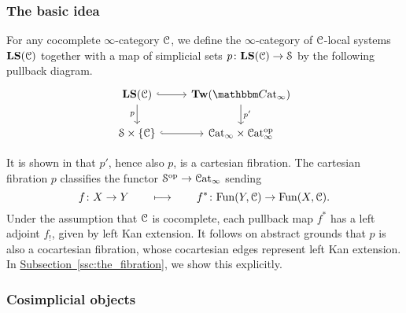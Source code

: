 \documentclass[main.tex]{subfiles}
\begin{document}
\subsubsection{The basic idea}
\label{sss:the_infinity_category_of_local_systems}


\begin{definition}
  For any cocomplete $\infty$-category $\mathcal{C}$, we define the $\infty$-category of $\mathcal{C}$-local systems $\mathbf{LS}(\mathcal{C})$ together with a map of simplicial sets $p\colon \mathbf{LS}(\mathcal{C}) \to \mathcal{S}$ by the following pullback diagram.
  \begin{equation}
    \label{eq:pullback_square_defining_local_systems}
    \begin{tikzcd}
      \LS(\category{C})
      \arrow[r, hook]
      \arrow[d, swap, "p"]
      & \Tw(\ICCat)
      \arrow[d, "p'"]
      \\
      \S \times \{\category{C}\}
      \arrow[r, hook]
      & \ICat \times \ICat\op
    \end{tikzcd}
  \end{equation}
\end{definition}

It is shown in \cite{garcia2020enhanced} that $p'$, hence also $p$, is a cartesian fibration. The cartesian fibration $p$ classifies the functor $\mathcal{S}^{\mathrm{op}} \to \mathcal{C}\mathrm{at}_{\infty}$ sending
\begin{equation*}
  f\colon X \to Y \qquad \longmapsto \qquad f^{*}\colon \mathrm{Fun}(Y, \mathcal{C}) \to \mathrm{Fun}(X, \mathcal{C}).
\end{equation*}
Under the assumption that $\mathcal{C}$ is cocomplete, each pullback map $f^{*}$ has a left adjoint $f_{!}$, given by left Kan extension. It follows on abstract grounds that $p$ is also a cocartesian fibration, whose cocartesian edges represent left Kan extension. In \hyperref[ssc:the_fibration]{Subsection~\ref*{ssc:the_fibration}}, we show this explicitly.

\subsubsection{Cosimplicial objects}
\label{sss:cosimplicial_objects}
\end{document}
